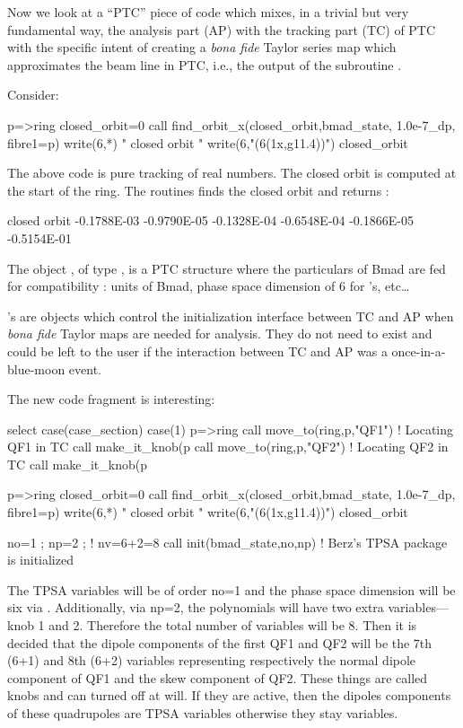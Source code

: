 \documentclass{hitec}     %
\begin{document}
{{{{{{Now we look at  a ``PTC'' piece of code which mixes, in a trivial  but very fundamental way, the analysis part (AP) with the tracking part (TC) of PTC with the specific intent of creating a {\it bona fide} Taylor series map which approximates the beam line in PTC, i.e., the output of the  subroutine  .  

Consider:

\begin{code}
p=>ring%
closed_orbit=0
call find_orbit_x(closed_orbit,bmad_state, 1.0e-7_dp, fibre1=p)
write(6,*) " closed orbit "
write(6,"(6(1x,g11.4))") closed_orbit
\end{code}

The above code is pure tracking of real numbers. The closed orbit is   computed at the start of the ring. The  routines finds the closed orbit and  returns :
\begin{code}
  closed orbit
 -0.1788E-03 -0.9790E-05 -0.1328E-04 -0.6548E-04 -0.1866E-05 -0.5154E-01
 \end{code}
 
 The object , of type , is a PTC structure where the particulars of Bmad are fed for compatibility : units of Bmad, phase space dimension of 6 for 's,  etc\ldots 
 
  's are objects which   control the initialization  interface between TC and AP when {\it bona fide} Taylor maps are needed for analysis. They do not need to exist and could be left to the user if the interaction between TC and AP was a once-in-a-blue-moon event.
 
 The new code fragment is interesting:
\begin{code}
select case(case_section)
case(1)
p=>ring%
call move_to(ring,p,"QF1")   !  Locating QF1 in TC
call make_it_knob(p%
call move_to(ring,p,"QF2")   !  Locating QF2 in TC
call make_it_knob(p%

p=>ring%
closed_orbit=0
call find_orbit_x(closed_orbit,bmad_state, 1.0e-7_dp, fibre1=p)
write(6,*) " closed orbit "
write(6,"(6(1x,g11.4))") closed_orbit
 
no=1 ; np=2 ;  ! nv=6+2=8
call init(bmad_state,no,np)   ! Berz's TPSA package is initialized
\end{code}



The TPSA variables will be of order no=1 and the phase space dimension will be six via .
Additionally, via np=2, the polynomials will have two extra variables---knob 1 and 2. Therefore the total number of variables will be 8.
Then it is decided that the dipole components of the first QF1 and QF2 will be the 7th (6+1) and 8th (6+2) variables representing
respectively the  normal dipole component of QF1 and the skew component of QF2. These things are called knobs and can turned off at will.
If they are active, then the dipoles components of these quadrupoles are TPSA variables otherwise they stay  variables.

}}}}}}
\end{document}

